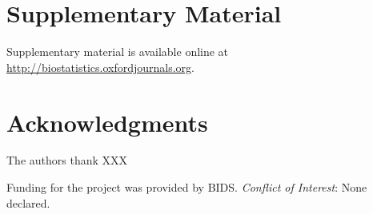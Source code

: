 \documentclass[oupdraft]{bio}
\begin{document}
\section{Supplementary Material}
\label{sec6}

Supplementary material is available online at
\url{http://biostatistics.oxfordjournals.org}.


\section*{Acknowledgments}

The authors thank XXX

Funding for the project was provided by BIDS.
{\it Conflict of Interest}: None declared.






\begin{figure}[!p]
\centering
\caption{}
\label{Fig1}
\end{figure}
\end{document}
